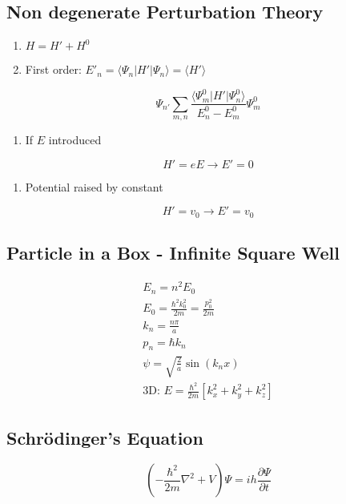 \documentclass[10pt,a4paper]{article}
\begin{document}
\subsection{Non degenerate Perturbation Theory}
\begin{enumerate}
    \item $H = H' + H^0$ 
    \item First order: $E'_n = \langle \Psi_n | H' | \Psi_n \rangle = \langle H' \rangle $
\end{enumerate}


\begin{equation}
 \Psi_{n'} \sum \limits_{m,n} \frac{\langle \Psi_m^0 | H' | \Psi_n^0 \rangle }{E_n^0 - E_m^0} \Psi_m^0 
\end{equation}

\begin{enumerate}
    \item If $E$ introduced
\end{enumerate}
\begin{equation}
    H' = eE \rightarrow E' = 0
\end{equation}
\begin{enumerate}
    \item Potential raised by constant
\end{enumerate}
\begin{equation}
    H' = v_0 \rightarrow E' = v_0
\end{equation}

\subsection{Particle in a Box - Infinite Square Well}
\begin{align}
 E_n = n^2 E_0\\
 E_0 = \frac{\hbar^2 k_0^2}{2m} = \frac{p_0^2}{2m}\\
 k_n = \frac{n \pi}{a}\\
 p_n = \hbar k_n \\
 \psi = \sqrt{\frac{2}{a}}\sin(k_nx)\\
 \textrm{3D: }E= \frac{\hbar^2}{2m} [k_x^2 + k_y^2 + k_z^2]
\end{align}

\subsection{Schr\"odinger's Equation}
\begin{equation}
    \left( - \frac{\hbar^2}{2m} \nabla^2 + V \right) \Psi = ih \frac{\partial \Psi}{\partial t}
\end{equation}
\end{document}
